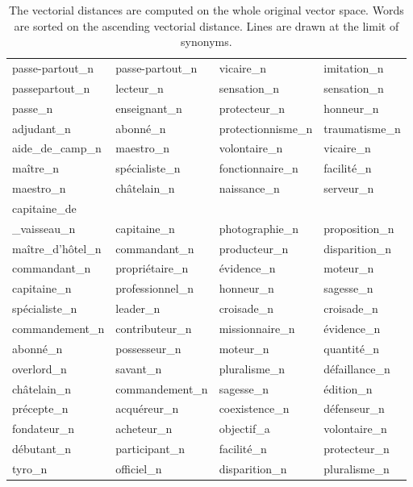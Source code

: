 \begin{table}
\begin{tabularx}{\textwidth}{*{4}{P{.23\textwidth}}}
passe-partout\_n & passe-partout\_n & vicaire\_n & imitation\_n\\
passepartout\_n & lecteur\_n & sensation\_n & sensation\_n\\
passe\_n & enseignant\_n & protecteur\_n & honneur\_n\\
adjudant\_n & abonné\_n & protectionnisme\_n & traumatisme\_n\\
aide\_de\_camp\_n & maestro\_n & volontaire\_n & vicaire\_n\\
maître\_n & spécialiste\_n & fonctionnaire\_n & facilité\_n\\
maestro\_n & châtelain\_n & naissance\_n & serveur\_n\\
capitaine\_de\\ \_vaisseau\_n & capitaine\_n & photographie\_n & proposition\_n\\
maître\_d'hôtel\_n & commandant\_n & producteur\_n & disparition\_n\\
commandant\_n & propriétaire\_n & évidence\_n & moteur\_n\\
capitaine\_n & professionnel\_n & honneur\_n & sagesse\_n\\
spécialiste\_n & leader\_n & croisade\_n & croisade\_n\\
commandement\_n & contributeur\_n & missionnaire\_n & évidence\_n\\
abonné\_n & possesseur\_n & moteur\_n & quantité\_n\\
overlord\_n & savant\_n & pluralisme\_n & défaillance\_n\\
châtelain\_n & commandement\_n & sagesse\_n & édition\_n\\
précepte\_n & acquéreur\_n & coexistence\_n & défenseur\_n\\
fondateur\_n & acheteur\_n & objectif\_a & volontaire\_n\\
débutant\_n & participant\_n & facilité\_n & protecteur\_n\\
tyro\_n & officiel\_n & disparition\_n & pluralisme\_n\\
\bottomrule
    \end{tabularx}
    \caption[Exemplar Neighborhoods in French Semantic Embeddings]{The vectorial distances are computed on the whole original vector space. Words are sorted on the ascending vectorial distance. Lines are drawn at the limit of synonyms. \label{tab:freNeighbour}}
    
    \end{table}